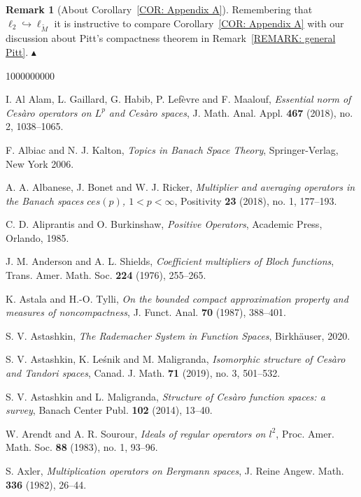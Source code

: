 \documentclass[11pt]{amsart}
\theoremstyle{definition}
\theoremstyle{definition}
\theoremstyle{definition}
\theoremstyle{definition}
\theoremstyle{definition}
\theoremstyle{definition}
\newtheorem{remark}[theorem]{Remark}
\theoremstyle{definition}
\theoremstyle{definition}
\numberwithin{equation}{section}
\numberwithin{equation}{section}
\numberwithin{equation}{section}
\theoremstyle{definition}
\theoremstyle{definition}
\theoremstyle{definition}
\theoremstyle{definition}
\theoremstyle{definition}
\theoremstyle{definition}
\newcommand\xqed[1]{%
	\leavevmode\unskip\penalty9999 \hbox{}\nobreak\hfill
	\quad\hbox{#1}}
\newcommand\demo{\xqed{{\Large $\blacktriangle$}}}
\begin{document}
\begin{remark}[About Corollary~\ref{COR: Appendix A}]
	Remembering that $\ell_2 \hookrightarrow \ell_{\widetilde{M}}$ it is instructive to compare Corollary~\ref{COR: Appendix A}
	with our discussion about Pitt's compactness theorem in Remark~\ref{REMARK: general Pitt}.
	\demo
\end{remark}

\begin{thebibliography}{1000000000}
	
	 I. Al Alam, L. Gaillard, G. Habib, P. Lef{\` e}vre and F. Maalouf, {\it Essential norm of Ces{\` a}ro operators on $L^p$ and Ces{\` a}ro spaces},
		J. Math. Anal. Appl. {\bf 467} (2018), no. 2, 1038--1065.
		
	 F. Albiac and N. J. Kalton, {\it Topics in Banach Space Theory}, Springer-Verlag, New York 2006.
	
	 A. A. Albanese, J. Bonet and W. J. Ricker, {\it Multiplier and averaging operators in the Banach spaces $ces(p)$, $1 < p < \infty$},
		Positivity {\bf 23} (2018), no. 1, 177--193.
	
	 C. D. Aliprantis and O. Burkinshaw, {\it Positive Operators}, Academic Press, Orlando, 1985.
	
	 J. M. Anderson and A. L. Shields, {\it Coefficient multipliers of Bloch functions}, Trans. Amer. Math. Soc. {\bf 224} (1976), 255--265.
	
	 K. Astala and H.-O. Tylli, {\it On the bounded compact approximation property and measures of noncompactness}, J. Funct. Anal. {\bf 70} (1987), 388--401.
		
	 S. V. Astashkin, {\it The Rademacher System in Function Spaces}, Birkh{\" a}user, 2020.
	
	 S. V. Astashkin, K. Le\'{s}nik and M. Maligranda, \textit{Isomorphic structure of Ces\`aro and Tandori spaces},
		Canad. J. Math. {\bf 71} (2019), no. 3, 501--532.
		
	 S. V. Astashkin and L. Maligranda, \textit{Structure of Ces\`aro function spaces: a survey}, Banach Center Publ. {\bf 102} (2014), 13--40.
	
	 W. Arendt and A. R. Sourour, {\it Ideals of regular operators on $l^2$}, Proc. Amer. Math. Soc. {\bf 88} (1983), no. 1, 93--96.
	
	 S. Axler, {\it Multiplication operators on Bergmann spaces}, J. Reine Angew. Math. {\bf 336} (1982), 26--44.
		

\end{thebibliography}
\end{document}
